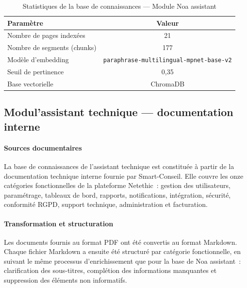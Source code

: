 \vspace{6pt}
\begin{table}[H]
\centering
\caption{Statistiques de la base de connaissances — Module Noa assistant}
\label{tab:kb_Noa assistant}
\begin{tabular}{|l|c|}
\hline
\textbf{Paramètre} & \textbf{Valeur} \\
\hline
Nombre de pages indexées    & 21 \\
\hline
Nombre de segments (chunks) & 177 \\
\hline
Modèle d'embedding          & \texttt{paraphrase-multilingual-mpnet-base-v2} \\
\hline
Seuil de pertinence         & 0,35 \\
\hline
Base vectorielle            & ChromaDB \\
\hline
\end{tabular}
\end{table}

\subsection{Modul'assistant technique — documentation interne}

\paragraph{Sources documentaires}\mbox{}\newline

La base de connaissances de l'assistant technique est constituée à partir
de la documentation technique interne fournie par Smart-Conseil.
Elle couvre les onze catégories fonctionnelles de la plateforme Netethic~:
gestion des utilisateurs, paramétrage, tableaux de bord, rapports, notifications,
intégration, sécurité, conformité RGPD, support technique, administration
et facturation.

\paragraph{Transformation et structuration}\mbox{}\newline

Les documents fournis au format PDF ont été convertis au format Markdown.
Chaque fichier Markdown a ensuite été structuré par catégorie fonctionnelle,
en suivant le même processus d'enrichissement que pour la base de Noa assistant~:
clarification des sous-titres, complétion des informations manquantes
et suppression des éléments non informatifs.

